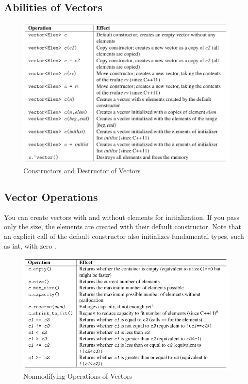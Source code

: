 \documentclass[12pt]{report}
\begin{document}
\subsection{Abilities of Vectors}
\begin{figure}[!htbp]
	\centering
	\includegraphics[width=1.\linewidth]{vectoroperation.png}
	\caption{Constructors and Destructor of Vectors}
	\label{fig:constructorofvector}
\end{figure}


\subsection{Vector Operations}
You can create vectors with and without
elements for initialization. If you pass only the size, the elements are created with their default
constructor. Note that an explicit call of the default constructor also initializes fundamental types,
such as int, with zero \cite{cppstdlib}.
\begin{figure}[!htbp]
	\centering
	\includegraphics[width=1.\linewidth]{vectoroperation2.png}
	\caption{Nonmodifying Operations of Vectors}
	\label{fig:constructorofvector}
\end{figure}
\end{document}
